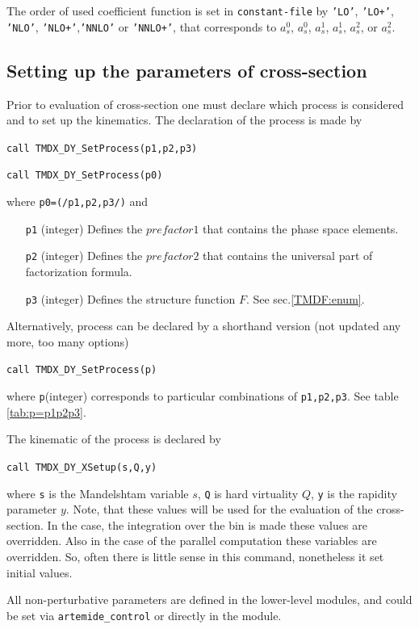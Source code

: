 \documentclass[prd,nofootinbib,eqsecnum,final]{revtex4}
\renewcommand{\(}{\left(}
\renewcommand{\)}{\right)}
\renewcommand{\[}{\left[}
\renewcommand{\]}{\right]}
\begin{document}
The order of used coefficient function is set in \texttt{constant-file} by \texttt{'LO'}, \texttt{'LO+'}, \texttt{'NLO'}, \texttt{'NLO+'},\texttt{'NNLO'} or \texttt{'NNLO+'}, that corresponds to $a_s^0$, $a_s^0$, $a_s^1$, $a_s^1$, $a_s^2$, or $a_s^2$.

\subsection{Setting up the parameters of cross-section}
\label{TMDX:setup}

Prior to evaluation of cross-section one must declare which process is considered and to set up the kinematics. The declaration of the process is made by

\texttt{call TMDX\_DY{\_}SetProcess(p1,p2,p3)}

\texttt{call TMDX\_DY{\_}SetProcess(p0)}

where \texttt{p0=(/p1,p2,p3/)} and
\begin{itemize}
\item[\texttt{p1}] (integer) Defines the $prefactor1$ that contains the phase space elements.
\item[\texttt{p2}] (integer) Defines the $prefactor2$ that contains the universal part of factorization formula. 
\item[\texttt{p3}] (integer) Defines the structure function $F$. See sec.\ref{TMDF:enum}.
\end{itemize}

Alternatively, process can be declared by a shorthand version (not updated any more, too many options)

\texttt{call TMDX\_DY{\_}SetProcess(p)}

where \texttt{p}(integer) corresponds to particular combinations of \texttt{p1,p2,p3}. See table \ref{tab:p=p1p2p3}.

The kinematic of the process is declared by

\texttt{call TMDX\_DY{\_}XSetup(s,Q,y)}

where \texttt{s} is the Mandelshtam variable $s$, \texttt{Q} is hard virtuality $Q$, \texttt{y} is the rapidity parameter $y$. Note, that these values will be used for the evaluation of the cross-section. In the case, the integration over the bin is made these values are overridden. Also in the case of the parallel computation these variables are overridden. So, often there is little sense in this command, nonetheless it set initial values.

All non-perturbative parameters are defined in the lower-level modules, and could be set via \texttt{artemide\_control} or directly in the module.
\end{document}
